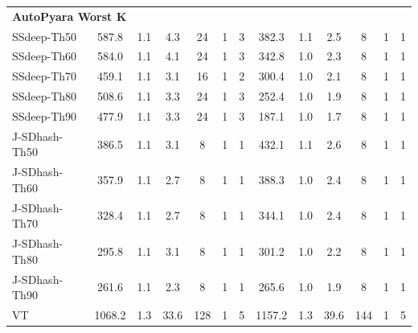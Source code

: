\begin{table}
{\begin{tabular}{lcccccccccccc}
\multicolumn{13}{l}{\textbf{AutoPyara Worst K}} \\
SSdeep-Th50   & 587.8 & 1.1 & 4.3 & 24 & 1 & 3 & 382.3 & 1.1 & 2.5 & 8 & 1 & 1 \\
SSdeep-Th60   & 584.0 & 1.1 & 4.1 & 24 & 1 & 3 & 342.8 & 1.0 & 2.3 & 8 & 1 & 1 \\
SSdeep-Th70   & 459.1 & 1.1 & 3.1 & 16 & 1 & 2 & 300.4 & 1.0 & 2.1 & 8 & 1 & 1 \\
SSdeep-Th80   & 508.6 & 1.1 & 3.3 & 24 & 1 & 3 & 252.4 & 1.0 & 1.9 & 8 & 1 & 1 \\
SSdeep-Th90   & 477.9 & 1.1 & 3.3 & 24 & 1 & 3 & 187.1 & 1.0 & 1.7 & 8 & 1 & 1 \\
J-SDhash-Th50 & 386.5 & 1.1 & 3.1 & 8  & 1 & 1 & 432.1 & 1.1 & 2.6 & 8 & 1 & 1 \\
J-SDhash-Th60 & 357.9 & 1.1 & 2.7 & 8  & 1 & 1 & 388.3 & 1.0 & 2.4 & 8 & 1 & 1 \\
J-SDhash-Th70 & 328.4 & 1.1 & 2.7 & 8  & 1 & 1 & 344.1 & 1.0 & 2.4 & 8 & 1 & 1 \\
J-SDhash-Th80 & 295.8 & 1.1 & 3.1 & 8  & 1 & 1 & 301.2 & 1.0 & 2.2 & 8 & 1 & 1 \\
J-SDhash-Th90 & 261.6 & 1.1 & 2.3 & 8  & 1 & 1 & 265.6 & 1.0 & 1.9 & 8 & 1 & 1 \\
VT            & 1068.2 & 1.3 & 33.6 & 128 & 1 & 5 & 1157.2 & 1.3 & 39.6 & 144 & 1 & 5 \\




\end{tabular}}
\end{table}
